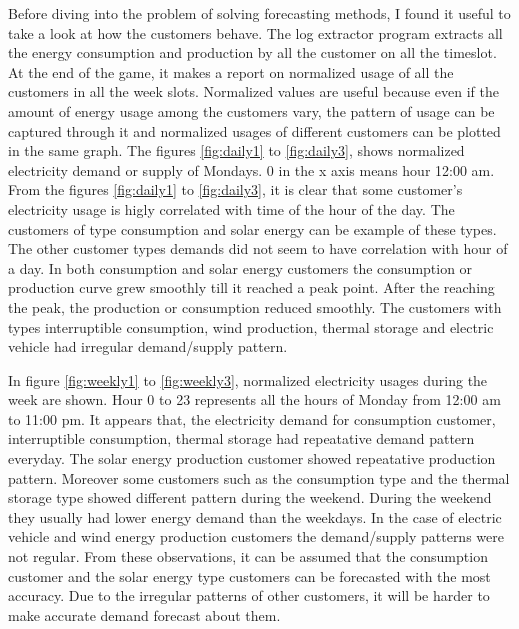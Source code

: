 Before diving into the problem of solving forecasting methods, I found it useful to take a look at how the customers behave. The log extractor program extracts all the energy consumption and production by all the customer on all the timeslot. At the end of the game, it makes a report on normalized usage of all the customers in all the week slots. Normalized values are useful because even if the amount of energy usage among the customers vary, the pattern of usage can be captured through it and normalized usages of different customers can be plotted in the same graph. The figures \ref{fig:daily1} to \ref{fig:daily3}, shows normalized electricity demand or supply of Mondays. 0 in the x axis means hour 12:00 am. From the figures \ref{fig:daily1} to \ref{fig:daily3}, it is clear that some customer's electricity usage is higly correlated with time of the hour of the day. The customers of type consumption and solar energy can be example of these types. The other customer types demands did not seem to have correlation with hour of a day. In both consumption and solar energy customers the consumption or production curve grew smoothly till it reached a peak point. After the reaching the peak, the production or consumption reduced smoothly. The customers with types interruptible consumption, wind production, thermal storage and electric vehicle had irregular demand/supply pattern. 

In figure \ref{fig:weekly1} to \ref{fig:weekly3}, normalized electricity usages during the week are shown. Hour 0 to 23 represents all the hours of Monday from 12:00 am to 11:00 pm. It appears that, the electricity demand for consumption customer, interruptible consumption, thermal storage had repeatative demand pattern everyday. The  solar energy production customer showed repeatative production pattern. Moreover some customers such as the consumption type and the thermal storage type showed different pattern during the weekend. During the weekend they usually had lower energy demand than the weekdays. In the case of electric vehicle and wind energy production customers the demand/supply patterns were not regular. From these observations, it can be assumed that the consumption customer and the solar energy type customers can be forecasted with the most accuracy. Due to the irregular patterns of other customers, it will be harder to make accurate demand forecast about them.
 
